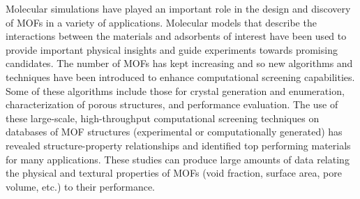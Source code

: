 \documentclass[twoside,twocolumn,9pt]{article}
\begin{document}
Molecular simulations have played an important role in the design and discovery of MOFs in a variety of applications.\cite{arni} Molecular models that describe the interactions between the materials and adsorbents of interest have been used to provide important physical insights and guide experiments towards promising candidates. The number of MOFs has kept increasing and so new algorithms and techniques have been introduced to enhance computational screening capabilities.\cite{moghadam,toolbox,ms_mofs,ms_Co2_methane} Some of these algorithms include those for crystal generation and enumeration, characterization of porous structures, and performance evaluation.\cite{core,characterization,diego_bottom_up} The use of these large-scale, high-throughput computational screening techniques on databases of MOF structures (experimental or computationally generated) has revealed structure-property relationships and identified top performing materials for many applications.\cite{wilmer,mof_hts,song_hts,wollman} These studies can produce large amounts of data relating the physical and textural properties of MOFs (void fraction, surface area, pore volume, etc.) to their performance. 
\end{document}
